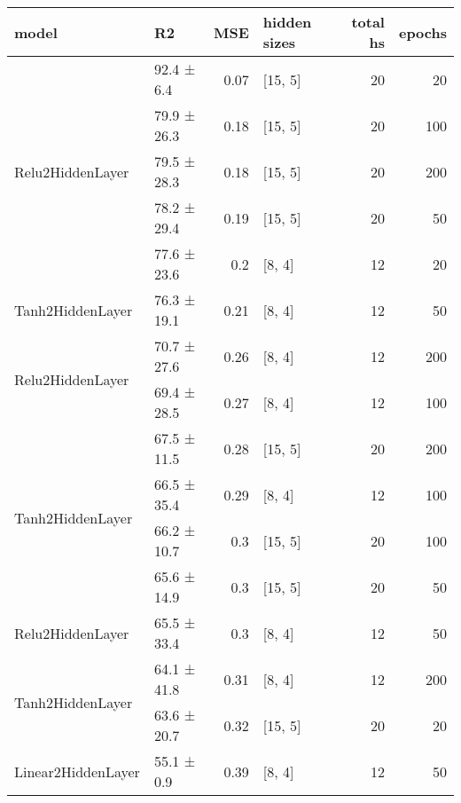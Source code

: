 
    \begin{table*}[h]
        \centering
        \begin{tabular}{llrlrr}
\hline
 model                                      & R2          &   MSE & hidden sizes   &   total hs &   epochs \\
\hline
 \hline
\multirow{5}{*}{Relu2HiddenLayer}   & 92.4 ± 6.4  &  0.07 & [15, 5]        &         20 &       20 \\
                                            & 79.9 ± 26.3 &  0.18 & [15, 5]        &         20 &      100 \\
                                            & 79.5 ± 28.3 &  0.18 & [15, 5]        &         20 &      200 \\
                                            & 78.2 ± 29.4 &  0.19 & [15, 5]        &         20 &       50 \\
                                            & 77.6 ± 23.6 &  0.2  & [8, 4]         &         12 &       20 \\
 \hline
Tanh2HiddenLayer                    & 76.3 ± 19.1 &  0.21 & [8, 4]         &         12 &       50 \\
 \hline
\multirow{2}{*}{Relu2HiddenLayer}   & 70.7 ± 27.6 &  0.26 & [8, 4]         &         12 &      200 \\
                                            & 69.4 ± 28.5 &  0.27 & [8, 4]         &         12 &      100 \\
 \hline
\multirow{4}{*}{Tanh2HiddenLayer}   & 67.5 ± 11.5 &  0.28 & [15, 5]        &         20 &      200 \\
                                            & 66.5 ± 35.4 &  0.29 & [8, 4]         &         12 &      100 \\
                                            & 66.2 ± 10.7 &  0.3  & [15, 5]        &         20 &      100 \\
                                            & 65.6 ± 14.9 &  0.3  & [15, 5]        &         20 &       50 \\
 \hline
Relu2HiddenLayer                    & 65.5 ± 33.4 &  0.3  & [8, 4]         &         12 &       50 \\
 \hline
\multirow{2}{*}{Tanh2HiddenLayer}   & 64.1 ± 41.8 &  0.31 & [8, 4]         &         12 &      200 \\
                                            & 63.6 ± 20.7 &  0.32 & [15, 5]        &         20 &       20 \\
 \hline
\multirow{4}{*}{Linear2HiddenLayer} & 55.1 ± 0.9  &  0.39 & [8, 4]         &         12 &       50 \\

\end{tabular}
\end{table*}
